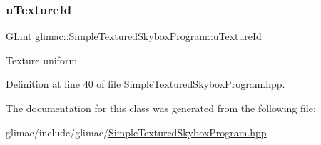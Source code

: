 \subsubsection{\texorpdfstring{u\+Texture\+Id}{uTextureId}}
{\footnotesize\ttfamily G\+Lint glimac\+::\+Simple\+Textured\+Skybox\+Program\+::u\+Texture\+Id}

Texture uniform 

Definition at line 40 of file Simple\+Textured\+Skybox\+Program.\+hpp.



The documentation for this class was generated from the following file\+:\begin{DoxyCompactItemize}
\item 
glimac/include/glimac/\hyperlink{_simple_textured_skybox_program_8hpp}{Simple\+Textured\+Skybox\+Program.\+hpp}\end{DoxyCompactItemize}
